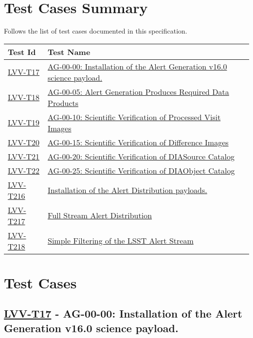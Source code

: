 \section{Test Cases Summary}\label{test-cases-summary}

Follows the list of test cases documented in this specification.

\begin{longtable}[]{p{3cm}p{13cm}}
\toprule
Test Id & Test Name\tabularnewline
\midrule
\endhead
    \hyperref[lvv-t17]{LVV-T17} &
    \href{https://jira.lsstcorp.org/secure/Tests.jspa\#/testCase/LVV-T17}{AG-00-00: Installation of the Alert Generation v16.0 science payload.} \tabularnewline
    \hyperref[lvv-t18]{LVV-T18} &
    \href{https://jira.lsstcorp.org/secure/Tests.jspa\#/testCase/LVV-T18}{AG-00-05: Alert Generation Produces Required Data Products} \tabularnewline
    \hyperref[lvv-t19]{LVV-T19} &
    \href{https://jira.lsstcorp.org/secure/Tests.jspa\#/testCase/LVV-T19}{AG-00-10: Scientific Verification of Processed Visit Images} \tabularnewline
    \hyperref[lvv-t20]{LVV-T20} &
    \href{https://jira.lsstcorp.org/secure/Tests.jspa\#/testCase/LVV-T20}{AG-00-15: Scientific Verification of Difference Images} \tabularnewline
    \hyperref[lvv-t21]{LVV-T21} &
    \href{https://jira.lsstcorp.org/secure/Tests.jspa\#/testCase/LVV-T21}{AG-00-20: Scientific Verification of DIASource Catalog} \tabularnewline
    \hyperref[lvv-t22]{LVV-T22} &
    \href{https://jira.lsstcorp.org/secure/Tests.jspa\#/testCase/LVV-T22}{AG-00-25: Scientific Verification of DIAObject Catalog} \tabularnewline
    \hyperref[lvv-t216]{LVV-T216} &
    \href{https://jira.lsstcorp.org/secure/Tests.jspa\#/testCase/LVV-T216}{Installation of the Alert Distribution payloads.} \tabularnewline
    \hyperref[lvv-t217]{LVV-T217} &
    \href{https://jira.lsstcorp.org/secure/Tests.jspa\#/testCase/LVV-T217}{Full Stream Alert Distribution} \tabularnewline
    \hyperref[lvv-t218]{LVV-T218} &
    \href{https://jira.lsstcorp.org/secure/Tests.jspa\#/testCase/LVV-T218}{Simple Filtering of the LSST Alert Stream} \tabularnewline
\bottomrule
\end{longtable}

\newpage

\section{Test Cases}

\subsection{\href{https://jira.lsstcorp.org/secure/Tests.jspa\#/testCase/LVV-T17}{LVV-T17}
    - AG-00-00: Installation of the Alert Generation v16.0 science payload.}\label{lvv-t17}

